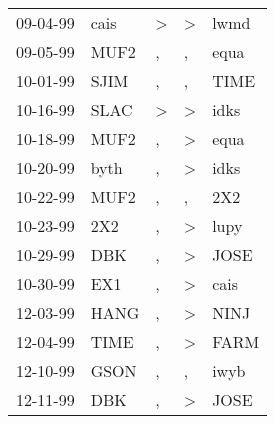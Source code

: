 \begin{supertabular}{p{0.07\textwidth}p{0.06\textwidth}p{0.02\textwidth}p{0.02\textwidth}p{0.06\textwidth}}
          09-04-99\textsuperscript{} &           cais\textsuperscript{} &  \textgreater &     \textgreater &           lwmd\textsuperscript{} \\
          09-05-99\textsuperscript{} &           MUF2\textsuperscript{} &             , &                , &           equa\textsuperscript{} \\
          10-01-99\textsuperscript{} &           SJIM\textsuperscript{} &             , &                , &           TIME\textsuperscript{} \\
          10-16-99\textsuperscript{} &           SLAC\textsuperscript{} &  \textgreater &     \textgreater &           idks\textsuperscript{} \\
          10-18-99\textsuperscript{} &           MUF2\textsuperscript{} &             , &     \textgreater &           equa\textsuperscript{} \\
          10-20-99\textsuperscript{} &           byth\textsuperscript{} &             , &     \textgreater &           idks\textsuperscript{} \\
          10-22-99\textsuperscript{} &           MUF2\textsuperscript{} &             , &                , &            2X2\textsuperscript{} \\
          10-23-99\textsuperscript{} &            2X2\textsuperscript{} &             , &     \textgreater &           lupy\textsuperscript{} \\
          10-29-99\textsuperscript{} &            DBK\textsuperscript{} &             , &     \textgreater &           JOSE\textsuperscript{} \\
          10-30-99\textsuperscript{} &            EX1\textsuperscript{} &             , &     \textgreater &           cais\textsuperscript{} \\
          12-03-99\textsuperscript{} &           HANG\textsuperscript{} &             , &     \textgreater &           NINJ\textsuperscript{} \\
          12-04-99\textsuperscript{} &           TIME\textsuperscript{} &             , &     \textgreater &           FARM\textsuperscript{} \\
          12-10-99\textsuperscript{} &           GSON\textsuperscript{} &             , &                , &           iwyb\textsuperscript{} \\
          12-11-99\textsuperscript{} &            DBK\textsuperscript{} &             , &     \textgreater &           JOSE\textsuperscript{} \\

\end{supertabular}
